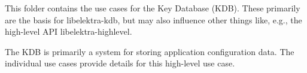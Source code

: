\label{doc_usecases_kdb_README_md_md_doc_usecases_kdb_README}%
%
 This folder contains the use cases for the Key Database (KDB). These primarily are the basis for {\ttfamily libelektra-\/kdb}, but may also influence other things like, e.\+g., the high-\/level API {\ttfamily libelektra-\/highlevel}.

The KDB is primarily a system for storing application configuration data. The individual use cases provide details for this high-\/level use case. 